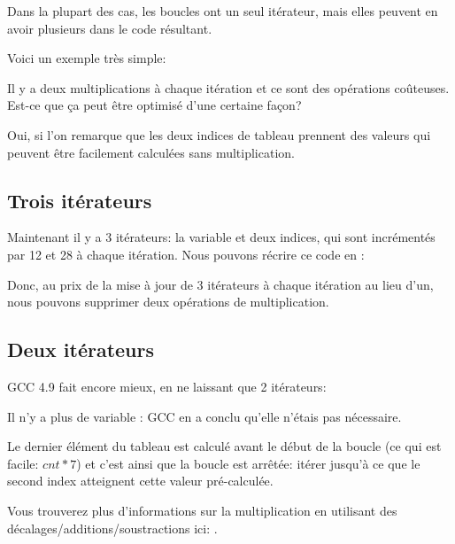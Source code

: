 ﻿
\label{loop_iterators}

Dans la plupart des cas, les boucles ont un seul itérateur, mais elles peuvent en
avoir plusieurs dans le code résultant.

Voici un exemple très simple:



Il y a deux multiplications à chaque itération et ce sont des opérations coûteuses.
Est-ce que ça peut être optimisé d'une certaine façon?

Oui, si l'on remarque que les deux indices de tableau prennent des valeurs qui peuvent
être facilement calculées sans multiplication.

\subsection{Trois itérateurs}



Maintenant il y a 3 itérateurs: la variable  et deux indices, qui sont incrémentés
par 12 et 28 à chaque itération.
Nous pouvons récrire ce code en \CCpp:



Donc, au prix de la mise à jour de 3 itérateurs à chaque itération au lieu d'un,
nous pouvons supprimer deux opérations de multiplication.

\subsection{Deux itérateurs}

GCC 4.9 fait encore mieux, en ne laissant que 2 itérateurs:



Il n'y a plus de variable : GCC en a conclu qu'elle n'étais pas nécessaire.

Le dernier élément du tableau  est calculé avant le début de la boucle (ce qui
est facile: $cnt*7$) et c'est ainsi que la boucle est arrêtée: itérer jusqu'à ce que
le second index atteignent cette valeur pré-calculée.

Vous trouverez plus d'informations sur la multiplication en utilisant des décalages/additions/soustractions
ici:
.

